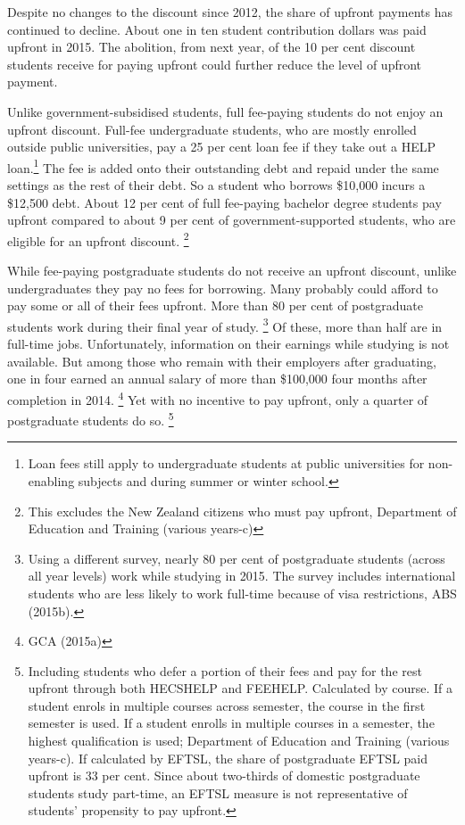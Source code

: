 \documentclass[embargoed]{grattan}
\begin{document}
{Despite no changes to the discount since 2012, the share of upfront payments has continued to decline.
About one in ten student contribution dollars was paid upfront in 2015.
The abolition, from next year, of the 10 per cent discount students receive for paying upfront could further reduce the level of upfront payment.

Unlike government-subsidised students, full fee-paying students do not enjoy an upfront discount.
Full-fee undergraduate students, who are mostly enrolled outside public universities, pay a 25 per cent loan fee if they take out a \gls{HELP} loan.\footnote{Loan fees still apply to undergraduate students at public universities for non-enabling subjects and during summer or winter school.} The fee is added onto their outstanding debt and repaid under the same settings as the rest of their debt.
So a student who borrows \$10,000 incurs a \$12,500 debt.
About 12 per cent of full fee-paying bachelor degree students pay upfront compared to about 9 per cent of government-supported students, who are eligible for an upfront discount.%
\footnote{This excludes the New Zealand citizens who must pay upfront, Department of Education and Training (various years-c)}

While fee-paying postgraduate students do not receive an upfront discount, unlike undergraduates they pay no fees for borrowing.
Many probably could afford to pay some or all of their fees upfront.
More than 80 per cent of postgraduate students work during their final year of study.%
\footnote{Using a different survey, nearly 80 per cent of postgraduate students (across all year levels) work while studying in 2015.
The survey includes international students who are less likely to work full-time because of visa restrictions, ABS (2015b).} Of these, more than half are in full-time jobs.
Unfortunately, information on their earnings while studying is not available.
But among those who remain with their employers after graduating, one in four earned an annual salary of more than \$100,000 four months after completion in 2014.%
\footnote{GCA (2015a)} Yet with no incentive to pay upfront, only a quarter of postgraduate students do so.%
\footnote{Including students who defer a portion of their fees and pay for the rest upfront through both \gls{HECSHELP} and \gls{FEEHELP}.
Calculated by course.
If a student enrols in multiple courses across semester, the course in the first semester is used.
If a student enrolls in multiple courses in a semester, the highest qualification is used; Department of Education and Training (various years-c).
If calculated by \gls{EFTSL}, the share of postgraduate \gls{EFTSL} paid upfront is 33 per cent.
Since about two-thirds of domestic postgraduate students study part-time, an \gls{EFTSL} measure is not representative of students' propensity to pay upfront.}

}
\end{document}
